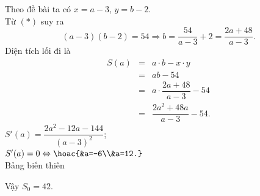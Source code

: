 \begin{bt}
{		Theo đề bài ta có $x=a-3$, $y=b-2$.\\
		Từ $(*)$ suy ra $$(a-3)(b-2)=54\Rightarrow b=\dfrac{54}{a-3}+2=\dfrac{2a+48}{a-3}.$$
		Diện tích lối đi là \begin{eqnarray*}
			S(a)&=&a\cdot b-x\cdot y\\
			&=&ab-54\\
			&=&a\cdot \dfrac{2a+48}{a-3}-54\\
			&=&\dfrac{2a^2+48a}{a-3}-54.
		\end{eqnarray*}
		$S'(a)=\dfrac{2a^2-12a-144}{\left(a-3\right)^2}$;\\
		$S'(a)=0\Leftrightarrow \hoac{&a=-6\\&a=12.}$\\
		Bảng biến thiên
		\begin{center}
		\end{center}
		Vậy $S_0=42$.
	}
\end{bt}

